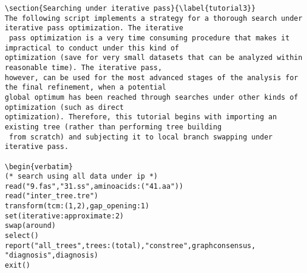 \begin{verbatim}
\section{Searching under iterative pass}{\label{tutorial3}}
The following script implements a strategy for a thorough search under iterative pass optimization. The iterative
 pass optimization is a very time consuming procedure that makes it impractical to conduct under this kind of 
optimization (save for very small datasets that can be analyzed within reasonable time). The iterative pass, 
however, can be used for the most advanced stages of the analysis for the final refinement, when a potential 
global optimum has been reached through searches under other kinds of optimization (such as direct 
optimization). Therefore, this tutorial begins with importing an existing tree (rather than performing tree building
 from scratch) and subjecting it to local branch swapping under iterative pass.

\begin{verbatim}
(* search using all data under ip *)
read("9.fas","31.ss",aminoacids:("41.aa"))
read("inter_tree.tre")
transform(tcm:(1,2),gap_opening:1)
set(iterative:approximate:2)
swap(around)
select()
report("all_trees",trees:(total),"constree",graphconsensus,
"diagnosis",diagnosis)
exit()
\end{verbatim}

